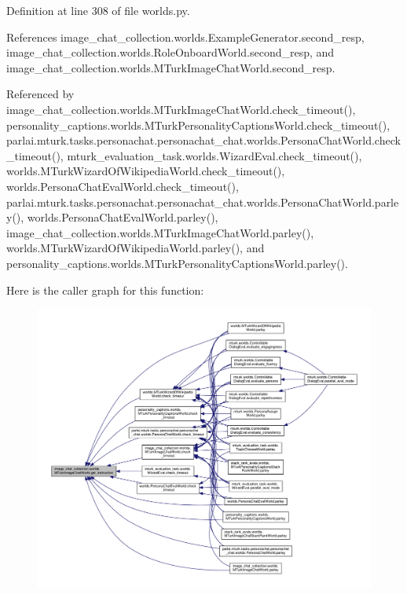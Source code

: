 Definition at line 308 of file worlds.\+py.



References image\+\_\+chat\+\_\+collection.\+worlds.\+Example\+Generator.\+second\+\_\+resp, image\+\_\+chat\+\_\+collection.\+worlds.\+Role\+Onboard\+World.\+second\+\_\+resp, and image\+\_\+chat\+\_\+collection.\+worlds.\+M\+Turk\+Image\+Chat\+World.\+second\+\_\+resp.



Referenced by image\+\_\+chat\+\_\+collection.\+worlds.\+M\+Turk\+Image\+Chat\+World.\+check\+\_\+timeout(), personality\+\_\+captions.\+worlds.\+M\+Turk\+Personality\+Captions\+World.\+check\+\_\+timeout(), parlai.\+mturk.\+tasks.\+personachat.\+personachat\+\_\+chat.\+worlds.\+Persona\+Chat\+World.\+check\+\_\+timeout(), mturk\+\_\+evaluation\+\_\+task.\+worlds.\+Wizard\+Eval.\+check\+\_\+timeout(), worlds.\+M\+Turk\+Wizard\+Of\+Wikipedia\+World.\+check\+\_\+timeout(), worlds.\+Persona\+Chat\+Eval\+World.\+check\+\_\+timeout(), parlai.\+mturk.\+tasks.\+personachat.\+personachat\+\_\+chat.\+worlds.\+Persona\+Chat\+World.\+parley(), worlds.\+Persona\+Chat\+Eval\+World.\+parley(), image\+\_\+chat\+\_\+collection.\+worlds.\+M\+Turk\+Image\+Chat\+World.\+parley(), worlds.\+M\+Turk\+Wizard\+Of\+Wikipedia\+World.\+parley(), and personality\+\_\+captions.\+worlds.\+M\+Turk\+Personality\+Captions\+World.\+parley().

Here is the caller graph for this function\+:
\nopagebreak
\begin{figure}[H]
\begin{center}
\leavevmode
\includegraphics[width=350pt]{classimage__chat__collection_1_1worlds_1_1MTurkImageChatWorld_ab3caeb29dc340a476579b1cc8d101608_icgraph}
\end{center}
\end{figure}
\mbox{\label{classimage__chat__collection_1_1worlds_1_1MTurkImageChatWorld_a7af5e011cc93106144797115af770537}} 
